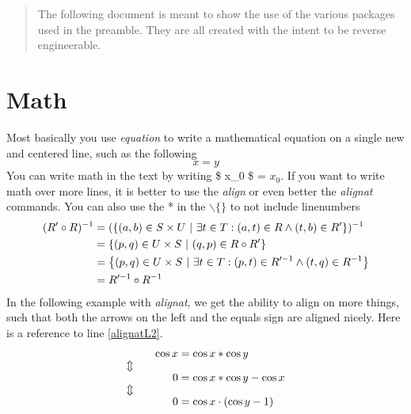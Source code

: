 \documentclass[a4, english, twoside]{article}
\begin{document}
\maketitle

\begin{abstract}
\noindent The following document is meant to show the use of the various packages used in the preamble. They are all created with the intent to be reverse engineerable.
\end{abstract}

\tableofcontents

\newpage
\section{Math} \label{sec:math}
Most basically you use \emph{equation} to write a mathematical equation on a single new and centered line, such as the following
\begin{equation}
	x = y
\end{equation}
You can write math in the text by writing \$ x\_0 \$ = $x_0$. If you want to write math over more lines, it is better to use the \emph{align} or even better the \emph{alignat} commands. You can also use the * in the $\backslash$$\{$$\}$ to not include linenumbers
\begin{align*}
	(R' \circ R)^{-1}
		&= (\set{(a,b) \in S \times U}{\exists t \in T: (a,t) \in R \wedge (t,b) \in R'})^{-1}
\\
		&= \set{(p,q) \in U \times S}{(q,p) \in R \circ R'}
\\
		&= \set{(p,q) \in U \times S}{\exists t \in T : (p,t) \in R'^{-1} \wedge (t,q) \in R^{-1}}
\\
		&= R'^{-1} \circ R^{-1}
\end{align*}
In the following example with \emph{alignat}, we get the ability to align on more things, such that both the arrows on the left and the equals sign are aligned nicely. Here is a reference to line \ref{alignatL2}.
\begin{alignat}{2}
    && \cos x &= \cos x * \cos y \label{alignatL1}
\\ \ArrowBetweenLines
    && 0 &= \cos x * \cos y - \cos x \label{alignatL2}
\\ \ArrowBetweenLines
    && 0 &= \cos x \cdot (\cos y - 1) \label{alignatL3}
\end{alignat}
\end{document}
